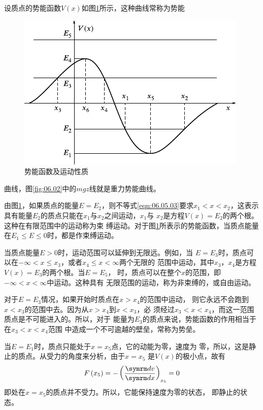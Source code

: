 设质点的势能函数$  V \left( x \right)   $如图\ref{fig:06.12}所示，这种曲线常称为势能
\begin{figure}[h]
    \centering
    \includegraphics{figure/fig06.12}
    \caption{势能函数及运动性质}
    \label{fig:06.12}
    \vspace{-0.8em}
\end{figure}
\clearpage\noindent
曲线，图\ref{fig:06.02}中的$ mgz $线就是重力势能曲线。


由图\ref{fig:06.12}，如果质点的能量$ E=E_2 $，则不等式\eqref{eqn:06.05.03}要求$x _ 1
    < x < x _ 2$，这表示具有能量$ E_2 $的质点只能在$ x_1 $与$ x_2 $之间运动，$ x_1 $与
$ x_2 $是方程$ V \left(x\right) = E_2 $的两个根。这种在有限范围中的运动称为束
缚运动。对于图\ref{fig:06.12}所表示的势能函数，当质点能量在$ E_1 \leqslant E \leqslant 0 $时，都是作束缚运动。

当质点能量$  E > 0  $时，运动范围可以延伸到无限远。例如，当
$ E = E _ 3 $时，质点可以在$ -\infty < x \leqslant x_3 $，或者$ x_4 \leqslant x < \infty $两个无限的
范围中运动，其中$ x_3 $，$ x_4 $是方程$  V \left( x \right) = E _ { 3 }   $的两个根。当$  E = E _ 5  $，
时，质点可以在整个$ x $的范围，即$  - \infty < x < \infty   $中运动。这种具有
无限范围的运动，称为非束缚的，或自由运动。

对于$  E = E _ 3  $情况，如果开始时质点在$  x > x _ { 4 }   $的范围中运动，
则它永远不会跑到$ x < x_3 $的范围中去。因为从$  x > x _ { 4 }   $到$  x < x _ 3 $，必
须经过$ x_3 < x < x_4 $，而这一范围质点是不可能进入的。所以，对于
能量为$ E_3 $的质点来说，势能函数的作用相当于在$  x _ { 3 } < x < x _ { 4 } $范围
中造成一个不可逾越的壁垒，常称为势垒。

当$  E = E _ 1 $时，质点只能处于$ x = x_5 $点，它的动能为零，速度为
零，所以，这是静止的质点。从受力的角度来分析，由于$ x = x_5 $
是$ V\left(x\right) $的极小点，故有
\begin{equation*}
  F \left( x _ { 5 } \right) = - \left( \frac { \dif v } { \dif x } \right) _ { x _ 5 } = 0
\end{equation*}
即处在$ x = x_5 $的质点并不受力。所以，它能保持速度为零的状态，
即静止的状态。

